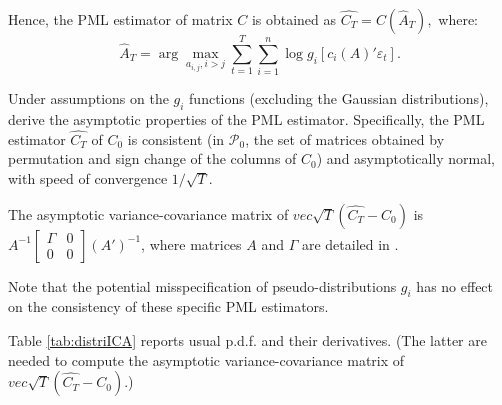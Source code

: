 \documentclass[
  11pt,
]{book}
\theoremstyle{definition}
\theoremstyle{definition}
\theoremstyle{definition}
\theoremstyle{definition}
\theoremstyle{remark}
\begin{document}
Hence, the PML estimator of matrix \(C\) is obtained as \(\widehat{C_T} = C(\hat{A}_T),\) where:
\begin{equation}
\hat{A}_T = \arg \max_{a_{i,j}, i>j} \sum^T_{t=1} \sum^n_{i=1} \log g_i [c_i (A)' \varepsilon_t].\label{eq:optimprob2}
\end{equation}

Under assumptions on the \(g_i\) functions (excluding the Gaussian distributions), \citet{Gourieroux_Monfort_Renne_2017} derive the asymptotic properties of the PML estimator. Specifically, the PML estimator \(\widehat{C_T}\) of \(C_0\) is consistent (in \(\mathcal{P}_0\), the set of matrices obtained by permutation and sign change of the columns of \(C_0\)) and asymptotically normal, with speed of convergence \(1/\sqrt{T}\).

The asymptotic variance-covariance matrix of \(vec \sqrt{T} (\widehat{C_T} - C_0)\) is \(A^{-1} \left[\begin{array}{cc} \Gamma & 0 \\ 0 & 0 \end{array} \right] (A')^{-1}\), where matrices \(A\) and \(\Gamma\) are detailed in \citet{Gourieroux_Monfort_Renne_2017}.

Note that the potential misspecification of pseudo-distributions \(g_i\) has no effect on the consistency of these specific PML estimators.

Table \ref{tab:distriICA} reports usual p.d.f. and their derivatives. (The latter are needed to compute the asymptotic variance-covariance matrix of \(vec \sqrt{T} (\widehat{C_T} - C_0)\).)
\end{document}

